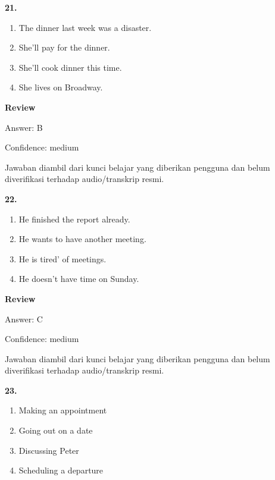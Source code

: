 \documentclass[12pt]{article}
\begin{document}
\vspace{0.25\baselineskip}
\noindent\textbf{21.}
\begin{enumerate}[label=(\Alph*),leftmargin=*,itemsep=0.2em]
\item The dinner last week was a disaster.
\item She'll pay for the dinner.
\item She'll cook dinner this time.
\item She lives on Broadway.
\end{enumerate}
\par
\begingroup
\setlength{\parskip}{0pt}
\setlength{\parindent}{0pt}
\textbf{Review}\par
Answer: B\par
Confidence: medium\par
Jawaban diambil dari kunci belajar yang diberikan pengguna dan belum diverifikasi terhadap audio/transkrip resmi.\par
\endgroup
\par
\vspace{0.25\baselineskip}
\noindent\textbf{22.}
\begin{enumerate}[label=(\Alph*),leftmargin=*,itemsep=0.2em]
\item He finished the report already.
\item He wants to have another meeting.
\item He is tired' of meetings.
\item He doesn't have time on Sunday.
\end{enumerate}
\par
\begingroup
\setlength{\parskip}{0pt}
\setlength{\parindent}{0pt}
\textbf{Review}\par
Answer: C\par
Confidence: medium\par
Jawaban diambil dari kunci belajar yang diberikan pengguna dan belum diverifikasi terhadap audio/transkrip resmi.\par
\endgroup
\par
\vspace{0.25\baselineskip}
\noindent\textbf{23.}
\begin{enumerate}[label=(\Alph*),leftmargin=*,itemsep=0.2em]
\item Making an appointment
\item Going out on a date
\item Discussing Peter
\item Scheduling a departure
\end{enumerate}
\end{document}
